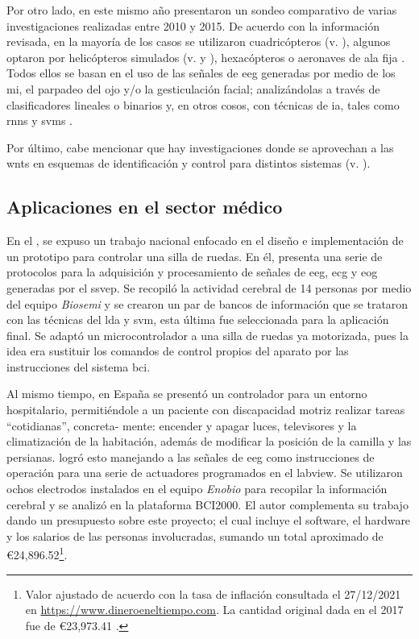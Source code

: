     Por otro lado, en este mismo año \citet{Nourmohammadi2018} presentaron un sondeo comparativo de varias investigaciones realizadas entre 2010 y 2015. De acuerdo con la información revisada, en la mayoría de los casos se utilizaron cuadricópteros (v. \cite{Khan2015,Kim2014a,LaFleur2013}), algunos optaron por helicópteros simulados (v. \cite{Doud2011} y \cite{Royer2010}), hexacópteros \cite{Shi2015} o aeronaves de ala fija \cite{Akce2010}. Todos ellos se basan en el uso de las señales de \acrlong{eeg} generadas por medio de los \acrlong{mi}, el parpadeo del ojo y/o la gesticulación facial; analizándolas a través de clasificadores lineales o binarios y, en otros cosos, con técnicas de \acrlong{ia}, tales como \glspl{rnn} \cite{KosMyna2015} y \glspl{svm} \cite{Kim2014a}.
    
    Por último, cabe mencionar que hay investigaciones donde se aprovechan a las \glspl{wnt} en esquemas de identificación y control para distintos sistemas (v. \cite{CarrilloSantos2012,HernandezPerez2018,VegaNavarrete2013,DominguezMayorga2017,GarciaCastro2020}).
    
    \subsection*{Aplicaciones en el sector médico}

    En el \citeyear{OlivaresCarillo2017}, se expuso un trabajo nacional enfocado en el diseño e implementación de un prototipo para controlar una silla de ruedas. En él, \citet{OlivaresCarillo2017} presenta una serie de protocolos para la adquisición y procesamiento de señales de \acrlong{eeg}, \acrfull{ecg} y \acrfull{eog} generadas por el \acrlong{ssvep}. Se recopiló la actividad cerebral de 14 personas por medio del equipo \textit{Biosemi} y se crearon un par de bancos de información que se trataron con las técnicas del \acrfull{lda} y \acrlong{svm}, esta última fue seleccionada para la aplicación final. Se adaptó un microcontrolador a una silla de ruedas ya motorizada, pues la idea era sustituir los comandos de control propios del aparato por las instrucciones del sistema \acrshort{bci}.
    
    Al mismo tiempo, en España se presentó un controlador para un entorno hospitalario, permitiéndole a un paciente con discapacidad motriz realizar tareas ``cotidianas'', concreta- mente: encender y apagar luces, televisores y la climatización de la habitación, además de modificar la posición de la camilla y las persianas. \citet{SanchezGarcia2017} logró esto manejando a las señales de \acrlong{eeg} como instrucciones de operación para una serie de actuadores programados en el \acrfull{labview}. Se utilizaron ochos electrodos instalados en el equipo \textit{Enobio} para recopilar la información cerebral y se analizó en la plataforma BCI2000. El autor complementa su trabajo dando un presupuesto sobre este proyecto; el cual incluye el software, el hardware y los salarios de las personas involucradas, sumando un total aproximado de \euro 24,896.52\footnote{Valor ajustado de acuerdo con la tasa de inflación consultada el 27/12/2021 en \url{https://www.dineroeneltiempo.com}. La cantidad original dada en el 2017 fue de \euro 23,973.41 \cite[Tab. 11]{SanchezGarcia2017}.}.
    
